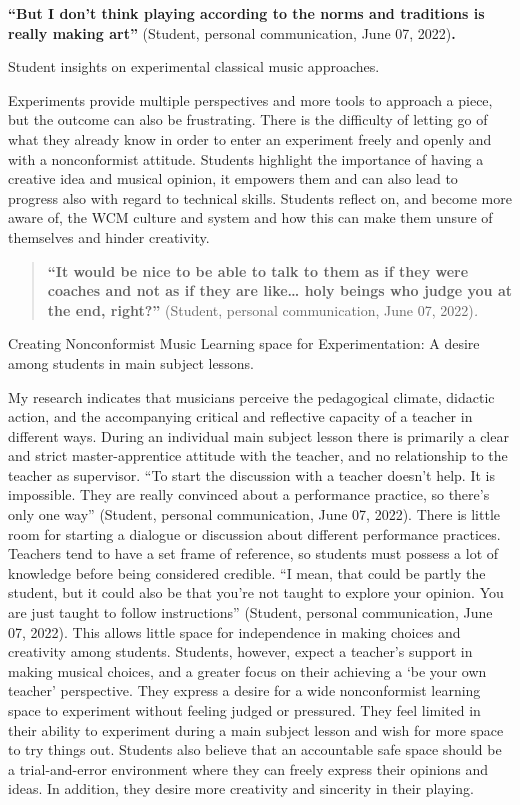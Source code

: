 \documentclass[authordate, empirical, issue]{jote-new-article}
\begin{document}
\textbf{“But I don't think playing according to the norms and traditions is really making art” }(Student, personal communication, June 07, 2022)\textbf{.}



Student insights on experimental classical music approaches.



Experiments provide multiple perspectives and more tools to approach a piece, but the outcome can also be frustrating. There is the difficulty of letting go of what they already know in order to enter an experiment freely and openly and with a nonconformist attitude. Students highlight the importance of having a creative idea and musical opinion, it empowers them and can also lead to progress also with regard to technical skills. Students reflect on, and become more aware of, the WCM culture and system and how this can make them unsure of themselves and hinder creativity.

\begin{quote}
  \textbf{“It would be nice to be able to talk to them as if they were coaches and not as if they are like… holy beings who judge you at the end, right?”} (Student, personal communication, June 07, 2022)\emph{.}
\end{quote}

Creating Nonconformist Music Learning space for Experimentation: A desire among students in main subject lessons.



My research indicates that musicians perceive the pedagogical climate, didactic action, and the accompanying critical and reflective capacity of a teacher in different ways. During an individual main subject lesson there is primarily a clear and strict master-apprentice attitude with the teacher, and no relationship to the teacher as supervisor. “To start the discussion with a teacher doesn't help. It is impossible. They are really convinced about a performance practice, so there's only one way” (Student, personal communication, June 07, 2022). There is little room for starting a dialogue or discussion about different performance practices. Teachers tend to have a set frame of reference, so students must possess a lot of knowledge before being considered credible. “I mean, that could be partly the student, but it could also be that you're not taught to explore your opinion. You are just taught to follow instructions” (Student, personal communication, June 07, 2022). This allows little space for independence in making choices and creativity among students. Students, however, expect a teacher's support in making musical choices, and a greater focus on their achieving a ‘be your own teacher' perspective. They express a desire for a wide nonconformist learning space to experiment without feeling judged or pressured. They feel limited in their ability to experiment during a main subject lesson and wish for more space to try things out. Students also believe that an accountable safe space should be a trial-and-error environment where they can freely express their opinions and ideas. In addition, they desire more creativity and sincerity in their playing.
\end{document}
